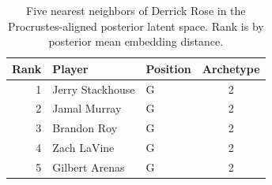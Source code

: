 \begin{table}[htbp]
  \centering\small
  \begin{tabular}{rllc}
    \toprule
    Rank & Player & Position & Archetype \\
    \midrule
    1 & Jerry Stackhouse & G & 2 \\
    2 & Jamal Murray & G & 2 \\
    3 & Brandon Roy & G & 2 \\
    4 & Zach LaVine & G & 2 \\
    5 & Gilbert Arenas & G & 2 \\
    \bottomrule
  \end{tabular}
  \caption{Five nearest neighbors of Derrick Rose in the Procrustes-aligned posterior latent space. Rank is by posterior mean embedding distance.}
\end{table}

